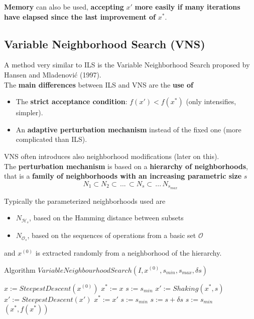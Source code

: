 \documentclass[11pt]{article}
\begin{document}
	\textbf{Memory} can also be used, \textbf{accepting} $x'$ \textbf{more easily if many iterations have elapsed since the last improvement of} $x^\ast$.\\
	
	\newpage
	
	\subsection{Variable Neighborhood Search (VNS)}
	
	A method very similar to ILS is the Variable Neighborhood Search proposed by Hansen and Mladenovi\'c (1997).\\
	
	The \textbf{main differences} between ILS and VNS are the \textbf{use of}
	\begin{itemize}
		\item The \textbf{strict acceptance condition}: $f (x') < f (x^\ast)$ (only intensifies, simpler).\\
		
		\item An \textbf{adaptive perturbation mechanism} instead of the fixed one (more complicated than ILS).\\
	\end{itemize}
	
	VNS often introduces also neighborhood modifications (later on this).\\
	
	The \textbf{perturbation mechanism} is based on a \textbf{hierarchy of neighborhoods}, that is a \textbf{family of neighborhoods with an increasing parametric size} $s$
	$$ N_1 \subset N_2 \subset \, ... \, \subset N_s \subset \, ... \, N_{s_{max}} $$
	
	
	Typically the parameterized neighborhoods used are
	\begin{itemize}
		\item $N_{\mathcal{H}_s}$, based on the Hamming distance between subsets
		
		\item $N_{\mathcal{O}_s}$, based on the sequences of operations from a basic set $\mathcal{O}$
	\end{itemize}
	
	and $x^{(0)}$ is extracted randomly from a neighborhood of the hierarchy.\\
	
	\newpage
	
	\begin{algorithm}
		\caption{Algorithm $VariableNeighbourhoodSearch(I , x^{(0)}, s_{min}, s_{max}, \delta s)$}
		\begin{algorithmic}
			\STATE $x := SteepestDescent(x^{(0)})$ 
			\STATE $x^\ast := x$
			\STATE $s := s_{min}$
				\STATE $x' := Shaking(x^\ast, s)$
				\STATE $x' := SteepestDescent(x')$
					\STATE $x^\ast := x'$
					\STATE $s := s_{min}$
				\ELSE 
					\STATE $s := s + \delta s$
				\ENDIF
					\STATE $s := s_{min}$
				\ENDIF
			\ENDFOR
			\RETURN $(x^\ast, f (x^\ast))$
		\end{algorithmic}
	\end{algorithm}
	
\end{document}
